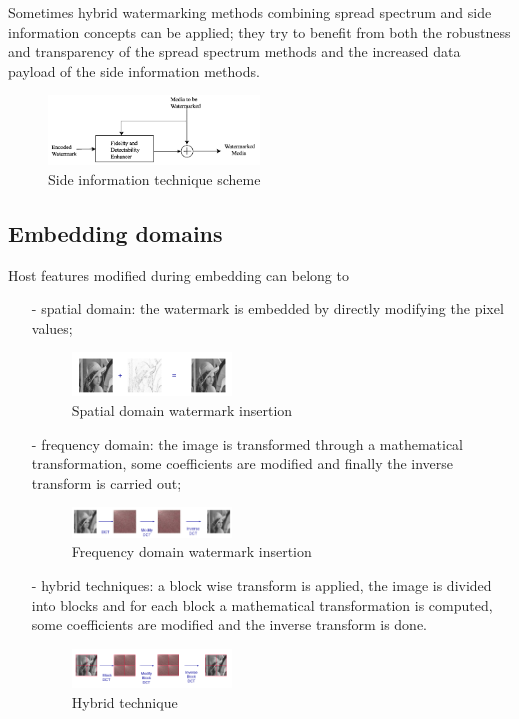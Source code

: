 Sometimes hybrid watermarking methods combining spread spectrum and side information concepts can be applied; they try to benefit from both the robustness and transparency of the spread
spectrum methods and the increased data payload of the side information methods.
\begin{figure}[h!]
\centering
\includegraphics[width=0.5\textwidth]{./img/si.png}
\caption{\small{Side information technique scheme}}
\label{fig:si}
\end{figure}


\subsection{Embedding domains}
Host features modified during embedding can
belong to 
\begin{itemize}
\item[-] spatial domain: the watermark is embedded by directly modifying the pixel values;
\begin{figure}[h!]
\centering
\includegraphics[width=0.4\textwidth]{./img/domain1.png}
\caption{\small{Spatial domain watermark insertion}}
\label{fig:dom1}
\end{figure}
\item[-] frequency domain: the image is transformed through a mathematical transformation, some coefficients are modified and finally the inverse transform is carried out;
\begin{figure}[h!]
\centering
\includegraphics[width=0.4\textwidth]{./img/domain2.png}
\caption{\small{Frequency domain watermark insertion}}
\label{fig:dom2}
\end{figure}
\item[-] hybrid techniques: a block wise transform is applied, the image is divided
into blocks and for each block a mathematical transformation is computed, some coefficients are modified and the inverse transform is done.
\begin{figure}[h!]
\centering
\includegraphics[width=0.4\textwidth]{./img/domain3.png}
\caption{\small{Hybrid technique}}
\label{fig:dom3}
\end{figure}
\end{itemize}

